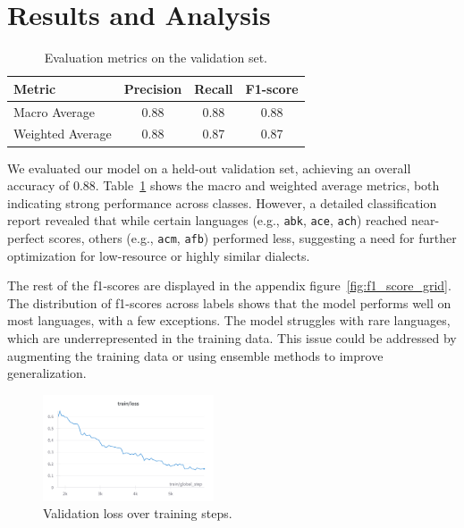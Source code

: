 \documentclass[11pt]{article}
\begin{document}
\section{Results and Analysis}
\begin{table}[H]
\centering
\setlength{\tabcolsep}{2pt}
\begin{tabular}{lccc}
\toprule
\textbf{Metric} & \textbf{Precision} & \textbf{Recall} & \textbf{F1-score} \\
\midrule
Macro Average & 0.88 & 0.88 & 0.88 \\
Weighted Average & 0.88 & 0.87 & 0.87 \\
\bottomrule
\end{tabular}
\caption{Evaluation metrics on the validation set.}
\label{tab:metrics}
\end{table}

We evaluated our model on a held-out validation set, achieving an overall accuracy of 0.88. Table~\ref{tab:metrics} shows the macro and weighted average metrics, both indicating strong performance across classes. However, a detailed classification report revealed that while certain languages (e.g., \texttt{abk}, \texttt{ace}, \texttt{ach}) reached near-perfect scores, others (e.g., \texttt{acm}, \texttt{afb}) performed less, suggesting a need for further optimization for low-resource or highly similar dialects.

The rest of the f1-scores are displayed in the appendix figure~\ref{fig:f1_score_grid}. The distribution of f1-scores across labels shows that the model performs well on most languages, with a few exceptions. The model struggles with rare languages, which are underrepresented in the training data. This issue could be addressed by augmenting the training data or using ensemble methods to improve generalization.

\begin{figure}[H]
    \centering
    \includegraphics[width=0.45\textwidth]{figures/new_ANLP_kaggle_validation_loss_over_epochs.png.png}
    \caption{Validation loss over training steps.}
    \label{fig:val_loss}
\end{figure}
\end{document}

